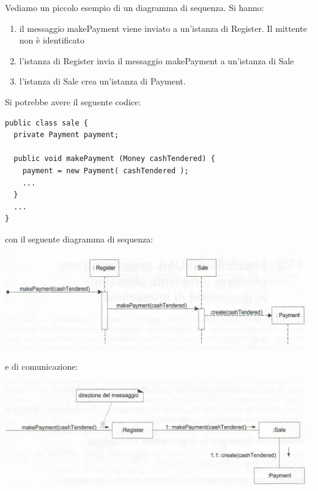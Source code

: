 \documentclass[a4paper,12pt, oneside]{book}
\begin{document}
\begin{shaded}
Vediamo un piccolo esempio di un diagramma di sequenza. Si hanno:
\begin{enumerate}
	\item il messaggio makePayment viene inviato a un'istanza di Register. Il mittente non è identificato
	\item l'istanza di Register invia il messaggio makePayment a un'istanza di Sale
	\item l'istanza di Sale crea un'istanza di Payment.
\end{enumerate}
Si potrebbe avere il seguente codice:
\begin{verbatim}
public class sale {
  private Payment payment;
  
  public void makePayment (Money cashTendered) {
    payment = new Payment( cashTendered );
    ...  
  }
  ...
}
\end{verbatim}
con il seguente diagramma di sequenza:
\begin{center}
	\includegraphics[scale=0.65]{img/seqsal.png}
\end{center}
e di comunicazione:
\begin{center}
	\includegraphics[scale=0.65]{img/comsal.png}
\end{center}
\end{shaded}
\end{document}
